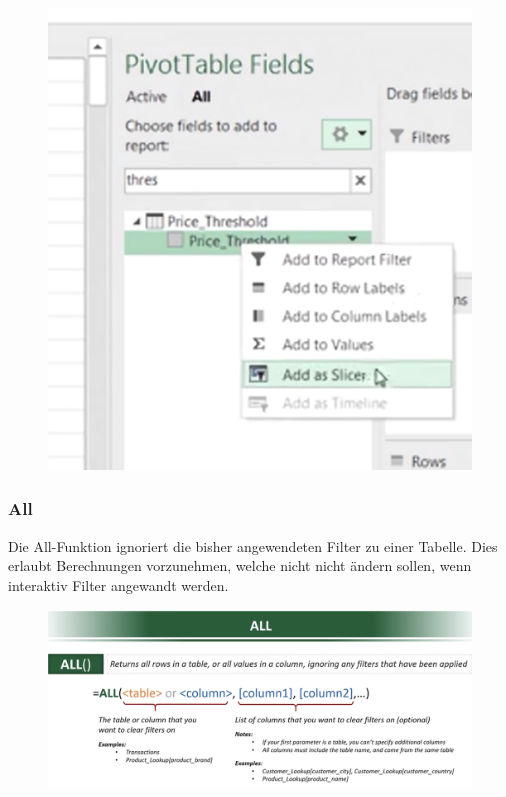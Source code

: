 \begin{figure}[H]
	\centering
	\includegraphics[scale = 0.3]{attachment/chapter_1/screenshot103}
	\caption{}
	\label{fig:screenshot103}
\end{figure} 

\subsubsection{All}
Die All-Funktion ignoriert die bisher angewendeten Filter zu einer Tabelle. Dies erlaubt Berechnungen vorzunehmen, welche nicht nicht ändern sollen, wenn interaktiv Filter angewandt werden.

\begin{figure}[H]
	\centering
	\includegraphics[scale = 0.3]{attachment/chapter_1/screenshot104}
	\caption{}
	\label{fig:screenshot104}
\end{figure} 


